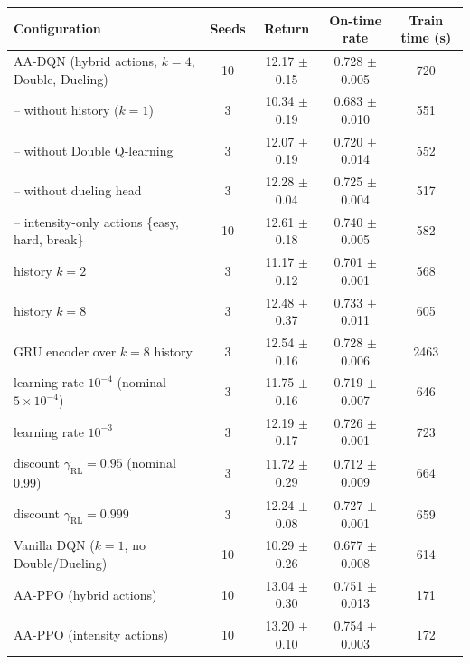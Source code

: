 \begin{tabular}{lcccc}
\toprule
Configuration & Seeds & Return & On-time rate & Train time (s) \\
\midrule
AA-DQN (hybrid actions, $k{=}4$, Double, Dueling) & 10 & 12.17 $\pm$ 0.15 & 0.728 $\pm$ 0.005 & 720 \\
-- without history ($k{=}1$) & 3 & 10.34 $\pm$ 0.19 & 0.683 $\pm$ 0.010 & 551 \\
-- without Double Q-learning & 3 & 12.07 $\pm$ 0.19 & 0.720 $\pm$ 0.014 & 552 \\
-- without dueling head & 3 & 12.28 $\pm$ 0.04 & 0.725 $\pm$ 0.004 & 517 \\
-- intensity-only actions \{easy, hard, break\} & 10 & 12.61 $\pm$ 0.18 & 0.740 $\pm$ 0.005 & 582 \\
history $k{=}2$ & 3 & 11.17 $\pm$ 0.12 & 0.701 $\pm$ 0.001 & 568 \\
history $k{=}8$ & 3 & 12.48 $\pm$ 0.37 & 0.733 $\pm$ 0.011 & 605 \\
GRU encoder over $k{=}8$ history & 3 & 12.54 $\pm$ 0.16 & 0.728 $\pm$ 0.006 & 2463 \\
learning rate $10^{-4}$ (nominal $5\times10^{-4}$) & 3 & 11.75 $\pm$ 0.16 & 0.719 $\pm$ 0.007 & 646 \\
learning rate $10^{-3}$ & 3 & 12.19 $\pm$ 0.17 & 0.726 $\pm$ 0.001 & 723 \\
discount $\gamma_{\mathrm{RL}}=0.95$ (nominal 0.99) & 3 & 11.72 $\pm$ 0.29 & 0.712 $\pm$ 0.009 & 664 \\
discount $\gamma_{\mathrm{RL}}=0.999$ & 3 & 12.24 $\pm$ 0.08 & 0.727 $\pm$ 0.001 & 659 \\
Vanilla DQN ($k{=}1$, no Double/Dueling) & 10 & 10.29 $\pm$ 0.26 & 0.677 $\pm$ 0.008 & 614 \\
AA-PPO (hybrid actions) & 10 & 13.04 $\pm$ 0.30 & 0.751 $\pm$ 0.013 & 171 \\
AA-PPO (intensity actions) & 10 & 13.20 $\pm$ 0.10 & 0.754 $\pm$ 0.003 & 172 \\
\bottomrule
\end{tabular}